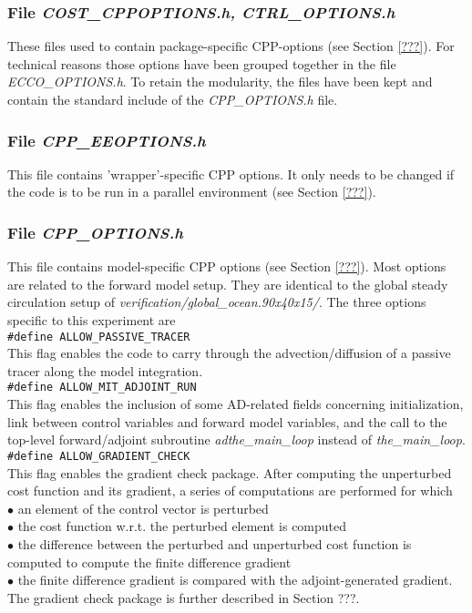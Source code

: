 \subsubsection{File {\it COST\_CPPOPTIONS.h,  CTRL\_OPTIONS.h}}

These files used to contain package-specific CPP-options
(see Section \ref{???}).
For technical reasons those options have been grouped together
in the file {\it ECCO\_OPTIONS.h}.
To retain the modularity, the files have been kept and contain
the standard include of the {\it CPP\_OPTIONS.h} file.

\subsubsection{File {\it CPP\_EEOPTIONS.h}}

This file contains 'wrapper'-specific CPP options.
It only needs to be changed if the code is to be run
in a parallel environment (see Section \ref{???}).

\subsubsection{File {\it CPP\_OPTIONS.h}}

This file contains model-specific CPP options
(see Section \ref{???}).
Most options are related to the forward model setup.
They are identical to the global steady circulation setup of
{\it verification/global\_ocean.90x40x15/}.
The three options specific to this experiment are \\
\hspace*{4ex} {\tt \#define ALLOW\_PASSIVE\_TRACER} \\
This flag enables the code to carry through the
advection/diffusion of a passive tracer along the
model integration. \\
\hspace*{4ex} {\tt \#define ALLOW\_MIT\_ADJOINT\_RUN} \\
This flag enables the inclusion of some AD-related fields
concerning initialization, link between control variables
and forward model variables, and the call to the top-level
forward/adjoint subroutine {\it adthe\_main\_loop}
instead of {\it the\_main\_loop}. \\
\hspace*{4ex} {\tt \#define ALLOW\_GRADIENT\_CHECK} \\
This flag enables the gradient check package.
After computing the unperturbed cost function and its gradient,
a series of computations are performed for which \\
$\bullet$ an element of the control vector is perturbed \\
$\bullet$ the cost function w.r.t. the perturbed element is
computed \\
$\bullet$ the difference between the perturbed and unperturbed
cost function is computed to compute the finite difference gradient \\
$\bullet$ the finite difference gradient is compared with the
adjoint-generated gradient.
The gradient check package is further described in Section ???.

